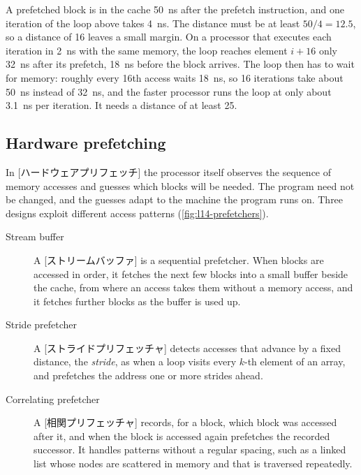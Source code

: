 \documentclass[../main.tex]{subfiles}
\begin{document}
\begin{example}
  \label{ex:l14-prefetch-distance}
  A prefetched block is in the cache \SI{50}{\nano\second} after the prefetch
  instruction, and one iteration of the loop above takes
  \SI{4}{\nano\second}.  The distance must be at least $50/4 = 12.5$, so a
  distance of 16 leaves a small margin.  On a processor that executes each
  iteration in \SI{2}{\nano\second} with the same memory, the loop reaches
  element $i+16$ only \SI{32}{\nano\second} after its prefetch,
  \SI{18}{\nano\second} before the block arrives.  The loop then has to wait
  for memory: roughly every 16th access waits \SI{18}{\nano\second}, so 16
  iterations take about \SI{50}{\nano\second} instead of
  \SI{32}{\nano\second}, and the faster processor runs the loop at only about
  \SI{3.1}{\nano\second} per iteration.  It needs a distance of at least 25.
\end{example}

\subsection{Hardware prefetching}

In [ハードウェアプリフェッチ] the processor itself
observes the sequence of memory accesses and guesses which blocks will be
needed.  The program need not be changed, and the guesses adapt to the
machine the program runs on.  Three designs exploit different access patterns
(\cref{fig:l14-prefetchers}).
\begin{description}
  \item[Stream buffer] A [ストリームバッファ]
    \cite{jouppi1990} is a sequential prefetcher.  When blocks are accessed
    in order, it fetches the next few blocks into a small buffer beside the
    cache, from where an
    access takes them without a memory access, and it fetches further blocks
    as the buffer is used up.
  \item[Stride prefetcher] A [ストライドプリフェッチャ]
    detects accesses that advance by a fixed distance, the \emph{stride}, as
    when a loop visits every $k$-th element of an array, and prefetches the
    address one or more strides ahead.
  \item[Correlating prefetcher] A
    [相関プリフェッチャ] records, for a block,
    which block was accessed after it, and when the block is accessed again
    prefetches the recorded successor.  It handles patterns without a regular
    spacing, such as a linked list whose nodes are scattered in memory and
    that is traversed repeatedly.
\end{description}
\end{document}
